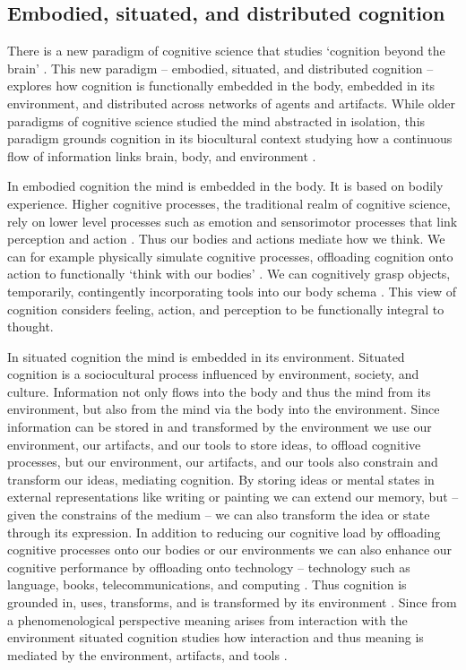 \documentclass{article}
\begin{document}
\subsection{Embodied, situated, and distributed cognition}
There is a new paradigm of cognitive science that studies `cognition beyond the brain' \citep{Hardy-Vallee2008}. 
This new paradigm -- embodied, situated, and distributed cognition -- explores how 
cognition is functionally embedded in the body, embedded in its environment, and distributed across networks of agents and artifacts. 
While older paradigms of cognitive science studied the mind abstracted in isolation, this paradigm grounds cognition in its biocultural context studying how a continuous flow of information links brain, body, and environment \citep{Hardy-Vallee2008}.

In embodied cognition the mind is embedded in the body. It is based on bodily experience. 
Higher cognitive processes, the traditional realm of cognitive science, rely on lower level processes
such as emotion and sensorimotor processes that link perception and action \citep{Hardy-Vallee2008}. 
Thus our bodies and actions mediate how we think. We can for example physically simulate cognitive processes, offloading cognition onto action to functionally `think with our bodies' \citep{Kirsh2013}. 
We can cognitively grasp objects, temporarily, contingently incorporating tools into our body schema \citep{Kirsh2013}.
This view of cognition considers feeling, action, and perception to be functionally integral to thought.

In situated cognition the mind is embedded in its environment. 
Situated cognition is a sociocultural process influenced by environment, society, and culture. Information not only flows into the body and thus the mind from its environment, but also from the mind via the body into the environment.
Since information can be stored in and transformed by the environment
we use our environment, our artifacts, and our tools to store ideas, to offload cognitive processes, but our environment, our artifacts, and our tools also constrain and transform our ideas, mediating cognition. 
By storing ideas or mental states in external representations like writing or painting
we can extend our memory, but -- given the constrains of the medium -- we can also transform the idea or state through its expression. 
In addition to reducing our cognitive load by offloading cognitive processes onto our bodies or our environments \citep{Wilson2002} 
we can also enhance our cognitive performance by offloading onto technology -- technology such as language, books, telecommunications, and computing \citep{Dror2008}. 
Thus cognition is grounded in, uses, transforms, and is transformed by its environment \citep{Hardy-Vallee2008,Anderson2008}.
Since from a phenomenological perspective meaning arises from interaction with the environment \citep{Dourish2001}
situated cognition studies how interaction and thus meaning is mediated by the environment, artifacts, and tools \citep{Reichelt2008}. 
\end{document}
